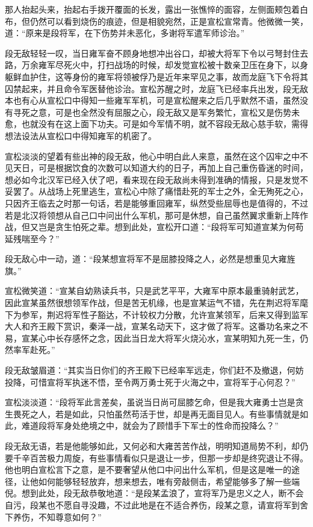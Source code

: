 那人抬起头来，抬起右手拨开覆面的长发，露出一张憔悴的面容，左侧面颊包着白布，但仍然可以看到烧伤的痕迹，但是相貌宛然，正是宣松宣常青。他微微一笑，道：“原来是段将军，在下伤势并未恶化，多谢将军遣军师诊治。”

段无敌轻轻一叹，当日雍军奋不顾身地想冲出谷口，却被大将军下令以弓弩封住去路，万余雍军尽死火中，打扫战场的时候，却发觉宣松被十数亲卫压在身下，以身躯鲜血护住，这等身份的雍军将领被俘乃是近年来罕见之事，故而龙庭飞下令将其囚禁起来，并且命令军医替他诊治。宣松苏醒之时，龙庭飞已经率兵出发，段无敌本也有心从宣松口中得知一些雍军军机，可是宣松醒来之后几乎默然不语，虽然没有寻死之意，可是也全然没有屈服之心，段无敌又是军务繁忙，宣松又是伤势未愈，也就没有在这上面下功夫。可是如今军情不明，就不容段无敌心慈手软，需得想法设法从宣松口中得知雍军的机密了。

宣松淡淡的望着有些出神的段无敌，他心中明白此人来意，虽然在这个囚牢之中不见天日，可是根据饮食的次数可以知道大约的日子，再加上自己重伤昏迷的时间，想必如今北汉军已经入伏了吧，看来现在段无敌尚未得到准确的情报，只是发觉不妥罢了。从战场上死里逃生，宣松心中除了痛惜赴死的军士之外，全无殉死之心，只因齐王临去之时那一句话，若是能够重回雍军，纵然受些屈辱也是值得的，不过若是北汉将领想从自己口中问出什么军机，那可是休想，自己虽然翼求重新上阵作战，但又岂是贪生怕死之辈。想到此处，宣松开口道：“段将军可知道宣某为何苟延残喘至今？”

段无敌心中一动，道：“段某想宣将军不是屈膝投降之人，必然是想重见大雍旌旗。”

宣松微笑道：“宣某自幼熟读兵书，只是武艺平平，大雍军中原本最重骑射武艺，因此宣某虽然很想领军作战，但是苦无机缘，也是宣某运气不错，先在荆迟将军麾下为参军，荆迟将军性子豁达，不计较权力分散，允许宣某领军，后来又得到监军大人和齐王殿下赏识，秦泽一战，宣某名动天下，这才做了将军。这番功名来之不易，宣某心中长存感怀之念，因此当日龙大将军火烧沁水，宣某明知九死一生，仍然率军赴死。”

段无敌皱眉道：“其实当日你们的齐王殿下已经率军远走，你们赶不及撤退，何妨投降，可惜宣将军执迷不悟，至令两万勇士死于火海之中，宣将军于心何忍？”

宣松淡淡道：“段将军此言差矣，虽说当日尚可屈膝乞命，但是我大雍勇士岂是贪生畏死之人，若是如此，只怕虽然苟活于世，却是再无面目见人。有些事情就是如此，难道段将军身处绝境之中，就会为了顾惜手下军士的性命而投降么？”

段无敌无语，若是他能够如此，又何必和大雍苦苦作战，明明知道局势不利，却仍要千辛百苦极力周旋，有些事情看似只是退让一步，但那一步却是终究退让不得。他也明白宣松言下之意，是不要奢望从他口中问出什么军机，但是这是唯一的途径，让他如何能够轻轻放弃，想来想去，唯有旁敲侧击，希望能够多了解一些端倪。想到此处，段无敌恭敬地道：“是段某孟浪了，宣将军乃是忠义之人，断不会自污，段某也不愿自寻没趣，不过此地是在不适合养伤，段某之意，请宣将军到舍下养伤，不知尊意如何？”

